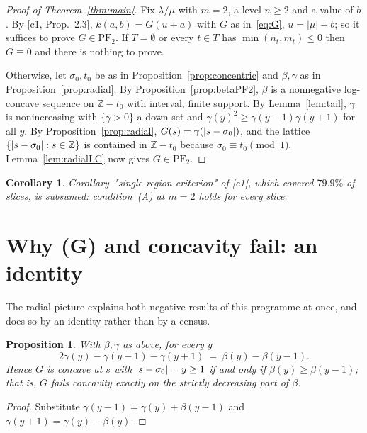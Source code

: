 \documentclass[11pt]{article}
\newtheorem{proposition}[theorem]{Proposition}
\newtheorem{corollary}[theorem]{Corollary}
\theoremstyle{definition}
\newcommand{\Z}{\mathbb Z}
\newcommand{\PFtwo}{\mathrm{PF}_2}
\DeclarePairedDelimiter{\abs}{\lvert}{\rvert}
\begin{document}
\begin{proof}[Proof of Theorem~\ref{thm:main}]
Fix $\lambda/\mu$ with $m=2$, a level $n\ge2$ and a value of $b$. By
[c1, Prop.~2.3], $k(a,b)=G(u+a)$ with $G$ as in~\eqref{eq:G}, $u=|\mu|+b$; so it suffices to
prove $G\in\PFtwo$. If $T=\emptyset$ or every $t\in T$ has $\min(n_t,m_t)\le0$ then
$G\equiv0$ and there is nothing to prove.

Otherwise, let $\sigma_0,t_0$ be as in Proposition~\ref{prop:concentric} and $\beta,\gamma$
as in Proposition~\ref{prop:radial}. By Proposition~\ref{prop:betaPF2}, $\beta$ is a
nonnegative log-concave sequence on $\Z-t_0$ with interval, finite support. By
Lemma~\ref{lem:tail}, $\gamma$ is nonincreasing with $\{\gamma>0\}$ a down-set and
$\gamma(y)^2\ge\gamma(y-1)\gamma(y+1)$ for all $y$. By Proposition~\ref{prop:radial},
$G(s)=\gamma(\abs{s-\sigma_0})$, and the lattice $\{\abs{s-\sigma_0}:s\in\Z\}$ is contained
in $\Z-t_0$ because $\sigma_0\equiv t_0\pmod1$. Lemma~\ref{lem:radialLC} now gives
$G\in\PFtwo$.
\end{proof}

\begin{corollary}
Corollary~"single-region criterion" of \textup{[c1]}, which covered $79.9\%$ of slices, is
subsumed: condition~(A) at $m=2$ holds for every slice.
\end{corollary}

\section{Why (G) and concavity fail: an identity}\label{sec:why}

The radial picture explains both negative results of this programme at once, and does so by
an identity rather than by a census.

\begin{proposition}\label{prop:whyfail}
With $\beta,\gamma$ as above, for every $y$
\begin{equation}\label{eq:concdeficit}
  2\gamma(y)-\gamma(y-1)-\gamma(y+1)\ =\ \beta(y)-\beta(y-1).
\end{equation}
Hence $G$ is concave at $s$ with $\abs{s-\sigma_0}=y\ge1$ if and only if
$\beta(y)\ge\beta(y-1)$; that is, $G$ fails concavity exactly on the strictly decreasing
part of $\beta$.
\end{proposition}
\begin{proof}
Substitute $\gamma(y-1)=\gamma(y)+\beta(y-1)$ and $\gamma(y+1)=\gamma(y)-\beta(y)$.
\end{proof}
\end{document}
